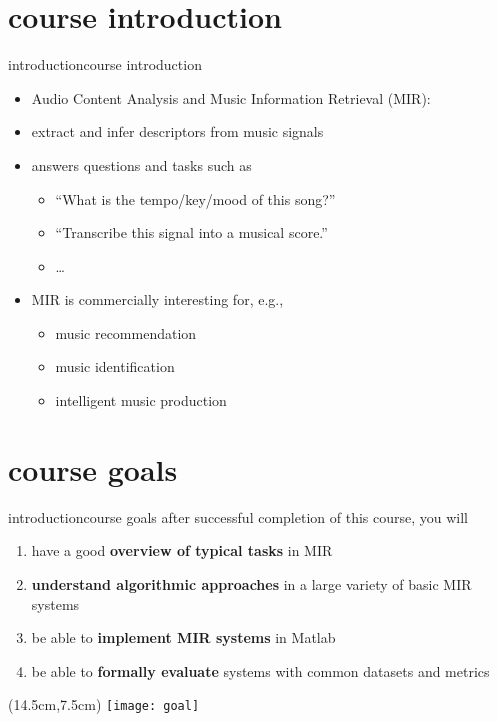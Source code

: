     \section[course intro]{course introduction}
        \begin{frame}{introduction}{course introduction}
            \begin{itemize}
                \item   Audio Content Analysis and Music Information Retrieval (MIR):
                \item   extract and infer descriptors from music signals
                \item   answers questions and tasks such as
                    \begin{itemize}
                        \item   ``What is the tempo/key/mood of this song?''
                        \item   ``Transcribe this signal into a musical score.''
                        \item   \ldots
                    \end{itemize}
                \bigskip
                \item<2->   MIR is commercially interesting for, e.g.,
                    \begin{itemize}
                        \item   music recommendation
                        \item   music identification
                        \item   intelligent music production
                    \end{itemize}
            \end{itemize}
        \end{frame}
        
    \section[course goals]{course goals}
        \begin{frame}{introduction}{course goals}
            after successful completion of this course, you will
            \smallskip
            \begin{enumerate}
                \item   have a good \textbf{overview of typical tasks} in MIR
                \item   \textbf{understand algorithmic approaches} in a large variety of basic MIR systems
                \item   be able to \textbf{implement MIR systems} in Matlab
                \item   be able to \textbf{formally evaluate} systems with common datasets and metrics
            \end{enumerate}
            \begin{textblock*}{100mm}(14.5cm,7.5cm)
                \texttt{[image: goal]}
            \end{textblock*}
        \end{frame}
        
